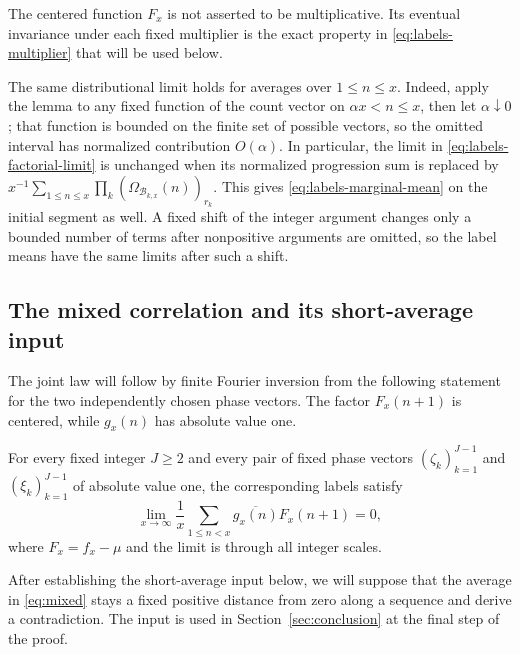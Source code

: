 The centered function $F_x$ is not asserted to be multiplicative.
Its eventual invariance under each fixed multiplier is the exact property
in \eqref{eq:labels-multiplier} that will be used below.

The same distributional limit holds for averages over $1\leq n\leq x$.
Indeed, apply the lemma to any fixed function of the count vector on
$\alpha x<n\leq x$, then let $\alpha\downarrow0$; that function is
bounded on the finite set of possible vectors, so the omitted interval
has normalized contribution $O(\alpha)$.  In particular,
the limit in \eqref{eq:labels-factorial-limit} is unchanged when its
normalized progression sum is replaced by
$x^{-1}\sum_{1\le n\le x}\prod_k(\Omega_{\mathcal B_{k,x}}(n))_{r_k}$.
This gives \eqref{eq:labels-marginal-mean} on the initial segment as
well.  A fixed shift of the integer argument changes only a bounded
number of terms after nonpositive arguments are omitted, so the label
means have the same limits after such a shift.

\subsection{The mixed correlation and its short-average input}

The joint law will follow by finite Fourier inversion from the following
statement for the two independently chosen phase vectors.  The factor
$F_x(n+1)$ is centered, while $g_x(n)$ has absolute value one.

\begin{proposition}\label{prop:mixed}
For every fixed integer $J\geq2$ and every pair of fixed phase vectors
$(\zeta_k)_{k=1}^{J-1}$ and $(\xi_k)_{k=1}^{J-1}$ of absolute value one,
the corresponding labels satisfy
\begin{equation}\label{eq:mixed}
 \lim_{x\to\infty}\frac1x\sum_{1\leq n<x}
                   \overline{g_x(n)}F_x(n+1)=0,
\end{equation}
where $F_x=f_x-\mu$ and the limit is through all integer scales.
\end{proposition}

After establishing the short-average input below, we will suppose that
the average in \eqref{eq:mixed} stays a fixed positive distance from zero
along a sequence and derive a contradiction.  The input is used in
Section~\ref{sec:conclusion} at the final step of the proof.

